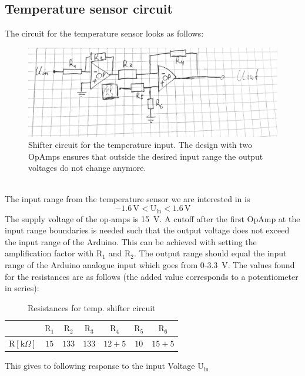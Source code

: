 \documentclass[12pt]{scrartcl}
\begin{document}
    \subsection{Temperature sensor circuit}
      The circuit for the temperature sensor looks as follows:
      \begin{figure}[h]
        \includegraphics[width = \textwidth]{circ.png}
        \caption{Shifter circuit for the temperature input. The design with
        two OpAmps ensures that outside the desired input range the output
        voltages do not change anymore.}
        \label{fig1}
      \end{figure}
      \\The input range from the temperature sensor we are interested in is
      $$-1.6 \, \text{V} < \text{U}_{\text{in}} < 1.6\, \text{V}$$
      The supply voltage of the op-amps is 15~V. A cutoff after
      the first OpAmp at the input range boundaries is needed such that the
      output voltage does not exceed the input range of the Arduino. This can be
      achieved with
      setting the amplification factor with $\text{R}_1$ and $\text{R}_2$. The output range
      should equal the input range of the Arduino analogue input which goes from
      0-3.3~V. The values found for the resistances are as follows (the added value
      corresponds to a potentiometer in series): \\
      \begin{table}[H]\label{tempres}
        \begin{tabular}{l|c c c c c c}
          & $\text{R}_1$ & $\text{R}_2$ & $\text{R}_3$ & $\text{R}_4$
          & $\text{R}_5$ & $\text{R}_6$ \\
          \hline\vspace{5pt}
          $\text{R}[\text{k}\Omega]$ & $15$ & $133$ & $133$ & $12 + 5$ & $10$
          & $15 + 5$
        \end{tabular}
        \caption{Resistances for temp. shifter circuit}
      \end{table}
      This gives to following response to the input Voltage $\text{U}_{\text{in}}$\\
\end{document}
